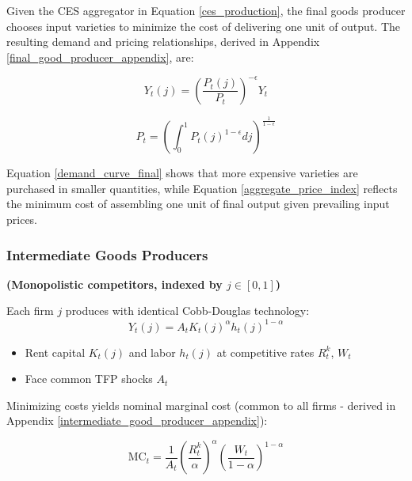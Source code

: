 \documentclass[11pt,preprint]{elsarticle}
\numberwithin{equation}{section}
\numberwithin{figure}{section}
\numberwithin{table}{section}
\def\tightlist{} %
\begin{document}
Given the CES aggregator in Equation \eqref{ces_production}, the final
goods producer chooses input varieties to minimize the cost of
delivering one unit of output. The resulting demand and pricing
relationships, derived in Appendix \ref{final_good_producer_appendix},
are:

\begin{equation}  
Y_t(j) = \left( \frac{P_t(j)}{P_t} \right)^{-\epsilon} Y_t  
\label{demand_curve_final}  
\end{equation}

\begin{equation}  
P_t = \left( \int_0^1 P_t(j)^{1-\epsilon}  dj \right)^{\frac{1}{1-\epsilon}}  
\label{aggregate_price_index}  
\end{equation}

Equation \ref{demand_curve_final} shows that more expensive varieties
are purchased in smaller quantities, while Equation
\ref{aggregate_price_index} reflects the minimum cost of assembling one
unit of final output given prevailing input prices.

\subsubsection{Intermediate Goods
Producers}\label{intermediate-goods-producers}

\textbf{(Monopolistic competitors, indexed by \(j \in [0,1]\))}

Each firm \(j\) produces with identical Cobb-Douglas technology:\\
\begin{equation}
Y_t(j) = A_t K_t(j)^{\alpha} h_t(j)^{1-\alpha}
\label{intermediate_production}
\end{equation}

\begin{itemize}
\tightlist
\item
  Rent capital \(K_t(j)\) and labor \(h_t(j)\) at competitive rates
  \(R_t^k\), \(W_t\)\\
\item
  Face common TFP shocks \(A_t\)
\end{itemize}

Minimizing costs yields nominal marginal cost (common to all firms -
derived in Appendix \ref{intermediate_good_producer_appendix}):

\begin{equation}
\text{MC}_t = \frac{1}{A_t} \left( \frac{R_t^k}{\alpha} \right)^{\alpha} \left( \frac{W_t}{1-\alpha} \right)^{1-\alpha}
\label{marginal_cost}
\end{equation}
\end{document}

